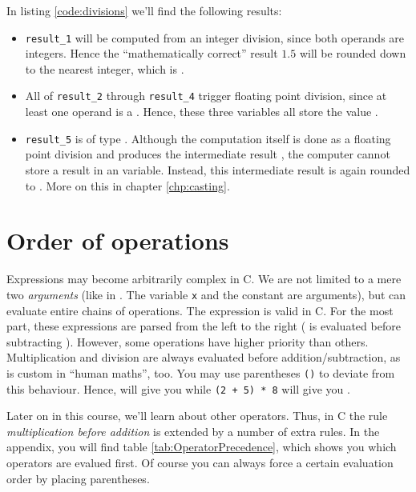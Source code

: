 In listing \ref{code:divisions} we'll find the following results:\vspace{-9pt}
\begin{itemize}
\setlength\itemsep{-6pt}
\item \texttt{result\_1} will be computed from an integer division, since both operands are integers. Hence the \enquote{mathematically correct} result $1.5$ will be rounded down to 
	the nearest integer, which is .
\item All of \texttt{result\_2} through \texttt{result\_4} trigger floating point division, since at least one operand is a . Hence, these three variables all store the 
	value .
\item \texttt{result\_5} is of type . Although the computation itself is done as a floating point division and produces the intermediate result , the computer cannot 
	store a  result in an  variable. Instead, this intermediate result is again rounded to . More on this in chapter \ref{chp:casting}.
\end{itemize}


\section{Order of operations} \label{sec:OrderOfOperations}
Expressions may become arbitrarily complex in C. We are not limited to a mere two \emph{arguments} (like in . The variable \texttt{x} and the constant  are arguments), but can evaluate entire chains of operations. The expression  is valid in C. For the most part, these expressions are parsed from the left to the right ( is evaluated before subtracting ). However, some operations have higher priority than others. Multiplication and division are always evaluated before addition/subtraction, as is custom in \enquote{human maths}, too. You may use parentheses \texttt{()} to deviate from this behaviour. Hence,  will give you  
while \texttt{(2 + 5) * 8} will give you .

Later on in this course, we'll learn about other operators. Thus, in C the rule \emph{multiplication before addition} is extended by a number of extra rules. In the appendix, you will find table \ref{tab:OperatorPrecedence}, which shows you which operators are evalued first. Of course you can always force a certain evaluation order by placing parentheses.

